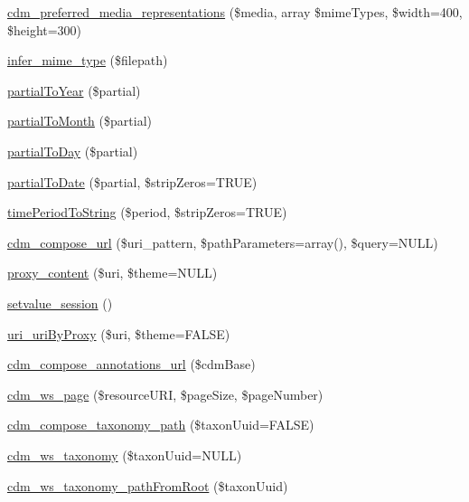 \begin{DoxyCompactItemize}
\item 
\hyperlink{cdm__api_8module_a93646cefc9e5d935bf761aec1f630657}{cdm\-\_\-preferred\-\_\-media\-\_\-representations} (\$media, array \$mime\-Types, \$width=400, \$height=300)
\item 
\hyperlink{cdm__api_8module_a97264d095926a3ffe17d2954243515ec}{infer\-\_\-mime\-\_\-type} (\$filepath)
\item 
\hyperlink{cdm__api_8module_a17e198dfa96a601175874b7addf2e413}{partial\-To\-Year} (\$partial)
\item 
\hyperlink{cdm__api_8module_a4f6053e28ad2141731c8b812dd0c440a}{partial\-To\-Month} (\$partial)
\item 
\hyperlink{cdm__api_8module_aa0a3d6a546b63e878ed6744fa0445af6}{partial\-To\-Day} (\$partial)
\item 
\hyperlink{cdm__api_8module_ada9150538b709e40ab30e925c2b70e8c}{partial\-To\-Date} (\$partial, \$strip\-Zeros=T\-R\-U\-E)
\item 
\hyperlink{cdm__api_8module_abe72eca940aeceb7371c70d62b1442a7}{time\-Period\-To\-String} (\$period, \$strip\-Zeros=T\-R\-U\-E)
\item 
\hyperlink{cdm__api_8module_ae30462f3724da40884ac8f53e56f4daa}{cdm\-\_\-compose\-\_\-url} (\$uri\-\_\-pattern, \$path\-Parameters=array(), \$query=N\-U\-L\-L)
\item 
\hyperlink{cdm__api_8module_a248d88b1b6bf15bc7c5dbdcbc916a75b}{proxy\-\_\-content} (\$uri, \$theme=N\-U\-L\-L)
\item 
\hyperlink{cdm__api_8module_a0608145087fdb2bda2376eb3b3fae19d}{setvalue\-\_\-session} ()
\item 
\hyperlink{cdm__api_8module_adfc4768ceb594192daac7b29d46ff47c}{uri\-\_\-uri\-By\-Proxy} (\$uri, \$theme=F\-A\-L\-S\-E)
\item 
\hyperlink{cdm__api_8module_ad09e6acd86df737dfaa7296fd277994a}{cdm\-\_\-compose\-\_\-annotations\-\_\-url} (\$cdm\-Base)
\item 
\hyperlink{cdm__api_8module_ab9c429dcd16f64c7489f765c0269e60d}{cdm\-\_\-ws\-\_\-page} (\$resource\-U\-R\-I, \$page\-Size, \$page\-Number)
\item 
\hyperlink{cdm__api_8module_a103ab657f4a21051393e84c6d9809d71}{cdm\-\_\-compose\-\_\-taxonomy\-\_\-path} (\$taxon\-Uuid=F\-A\-L\-S\-E)
\item 
\hyperlink{cdm__api_8module_abac94e8d94dfe1b95c62face281f37c9}{cdm\-\_\-ws\-\_\-taxonomy} (\$taxon\-Uuid=N\-U\-L\-L)
\item 
\hyperlink{cdm__api_8module_a578468338726563ae902390cca6507b4}{cdm\-\_\-ws\-\_\-taxonomy\-\_\-path\-From\-Root} (\$taxon\-Uuid)

\end{DoxyCompactItemize}
